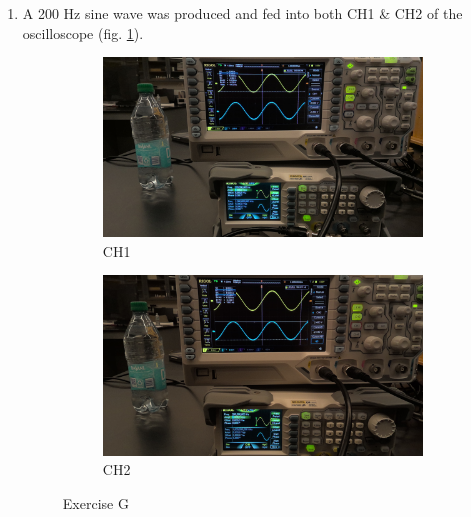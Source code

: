 \documentclass{article}
\begin{document}
\begin{enumerate}[label=(\alph*)]
                \item A 200 Hz sine wave was produced and fed into both CH1 \& CH2 of the oscilloscope (fig. \ref{exg}).
                \begin{figure}[p]
                    \begin{subfigure}{\textwidth/2}
                        \includegraphics[width=\linewidth]{g ch1.jpg}
                        \caption{CH1}
                    \end{subfigure}
                    \begin{subfigure}{\textwidth/2}
                        \includegraphics[width=\linewidth]{g ch2.jpg}
                        \caption{CH2}
                    \end{subfigure}
                    \caption{Exercise G}
                    \label{exg}
                \end{figure}
            \end{enumerate}
\end{document}

